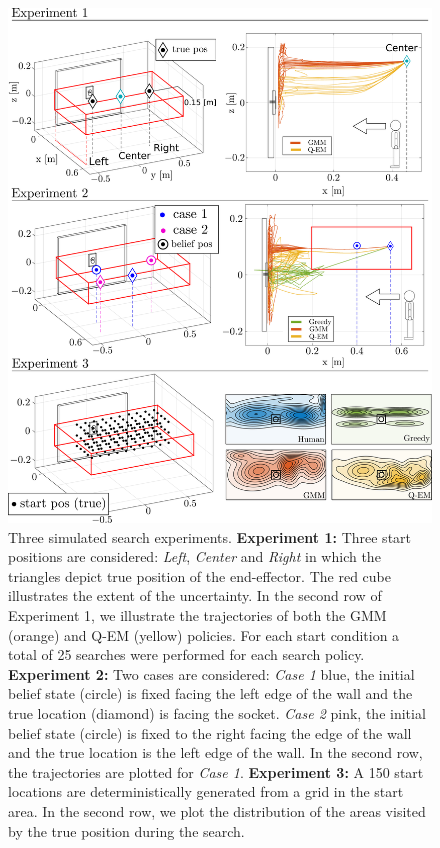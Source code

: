 \documentclass[final,3p,times,twocolumn]{elsarticle}
\begin{document}
\begin{figure}
    \centering
    \hspace*{-1.4cm}
    \includegraphics[width=1.2\textwidth]{./Figures/Fig/experiment_final_v3.pdf}
    \caption{Three simulated search experiments. \textbf{Experiment 1:} Three start positions are considered: \textit{Left}, \textit{Center} and
     \textit{Right} in which the triangles depict true position of the end-effector. The red cube illustrates the extent of the uncertainty. 
     In the second row of Experiment 1, we illustrate the trajectories of both the GMM (orange) and Q-EM (yellow) policies. For each start condition 
     a total of 25 searches were performed for each search policy. 
     \textbf{Experiment 2:} Two cases are considered: \textit{Case 1} blue, the initial belief state (circle) is fixed facing 
     the left edge of the wall and the true location (diamond) is facing the socket.
     \textit{Case 2} pink, the initial belief state (circle) is fixed to the right facing the edge of the wall and the 
     true location is the left edge of the wall. In the second row, the trajectories are plotted for \textit{Case 1}.
     \textbf{Experiment 3:} A 150 start locations are deterministically generated from a 
     grid in the start area. In the second row, we plot the distribution of the areas visited by the true position during the search.}
    \label{fig:box_exp_sim}
\end{figure}
\end{document}
